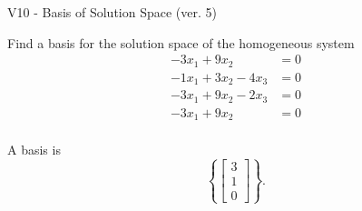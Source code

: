 \begin{exercise}
  \begin{exerciseTitle}V10 - Basis of Solution Space (ver. 5)\end{exerciseTitle}
  \begin{exerciseStatement}
    Find a basis for the solution space of the homogeneous system 
\begin{align*}
 -3 x_ 1 + 9 x_ 2 &= 0  \\ 
  -1 x_ 1 + 3 x_ 2 -4 x_ 3 &= 0  \\ 
  -3 x_ 1 + 9 x_ 2 -2 x_ 3 &= 0  \\ 
  -3 x_ 1 + 9 x_ 2 &= 0  \\ 
 \end{align*}


 
  \end{exerciseStatement}

  \begin{exerciseAnswer}
   A basis is   
\[\left\{\left[\begin{array}{c}
3 \\
1 \\
0
\end{array}\right]\right\}.\]

  


  \end{exerciseAnswer}
\end{exercise}
